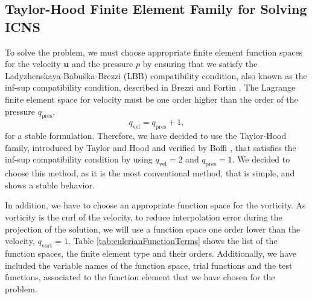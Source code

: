 \subsection{Taylor-Hood Finite Element Family for Solving ICNS}
To solve the  problem, we must choose appropriate finite element function spaces for the velocity $\mathbf{u}$ and the pressure $p$ by ensuring that we satisfy the Ladyzhenskaya-Babu\v{s}ka-Brezzi (LBB) compatibility condition, also known as the inf-sup compatibility condition, described in Brezzi and Fortin \cite{Brezzi1991}. The Lagrange finite element space for velocity must be one order higher than the order of the pressure $q_{\mathrm{pres}}$,
	\begin{equation}
	q_{\mathrm{vel}} = 	q_{\mathrm{pres}} + 1,
	\end{equation}
for a stable formulation. Therefore, we have decided to use the Taylor-Hood family, introduced by Taylor and Hood \cite{Taylor1973} and verified by Boffi \cite{Boffi1997}, that satisfies the inf-sup compatibility condition by using $q_{\mathrm{vel}} = 2$ and $q_{\mathrm{pres}} = 1$. We decided to choose this method, as it is the most conventional method, that is simple, and shows a stable behavior.


In addition, we have to choose an appropriate function space for the vorticity. As vorticity is the curl of the velocity, to reduce interpolation error during the projection of the solution, we will use a function space one order lower than the velocity, $q_{\mathrm{vort}} = 1$. Table \ref{tab:eulerianFunctionTerms} shows the list of the function spaces, the finite element type and their orders. Additionally, we have included the variable names of the function space, trial functions and the test functions, associated to the function element that we have chosen for the problem.

